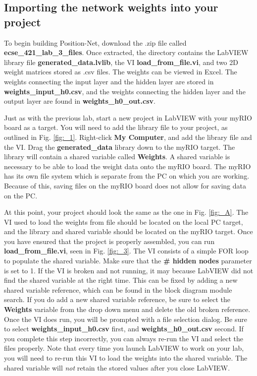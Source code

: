 \documentclass{article}
\begin{document}
\subsection{Importing the network weights into your project}

To begin building Position-Net, download the .zip file called \textbf{ecse\_421\_lab\_3\_files}. Once extracted, the directory contains the LabVIEW library file \textbf{generated\_data.lvlib}, the VI \textbf{load\_from\_file.vi}, and two 2D weight matrices stored as .csv files. The weights can be viewed in Excel. The weights connecting the input layer and the hidden layer are stored in \textbf{weights\_input\_h0.csv}, and the weights connecting the hidden layer and the output layer are found in \textbf{weights\_h0\_out.csv}. 

Just as with the previous lab, start a new project in LabVIEW with your myRIO board as a target. You will need to add the library file to your project, as outlined in Fig. \ref{fig:_1}. Right-click \textbf{My Computer}, and add the library file and the VI. Drag the \textbf{generated\_data} library down to the myRIO target. The library will contain a shared variable called \textbf{Weights}. A shared variable is necessary to be able to load the weight data onto the myRIO board. The myRIO has its own file system which is separate from the PC on which you are working. Because of this, saving files on the myRIO board does not allow for saving data on the PC. 

At this point, your project should look the same as the one in Fig. \ref{fig:_A}. The VI used to load the weights from file should be located on the local PC target, and the library and shared variable should be located on the myRIO target. Once you have ensured that the project is properly assembled, you can run \textbf{load\_from\_file.vi}, seen in Fig. \ref{fig:_3}. The VI consists of a simple FOR loop to populate the shared variable. Make sure that the \textbf{# hidden nodes} parameter is set to 1. If the VI is broken and not running, it may because LabVIEW did not find the shared variable at the right time. This can be fixed by adding a new shared variable reference, which can be found in the block diagram module search. If you do add a new shared variable reference, be sure to select the \textbf{Weights} variable from the drop down menu and delete the old broken reference. Once the VI does run, you will be prompted with a file selection dialog. Be sure to select \textbf{weights\_input\_h0.csv} first, and \textbf{weights\_h0\_out.csv} second. If you complete this step incorrectly, you can always re-run the VI and select the files properly. Note that every time you launch LabVIEW to work on your lab, you will need to re-run this VI to load the weights into the shared variable. The shared variable will \textit{not} retain the stored values after you close LabVIEW.
\end{document}
